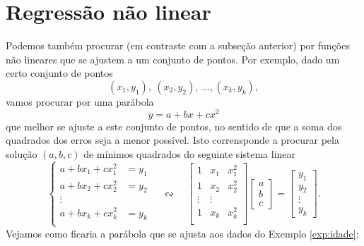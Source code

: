 \section{Regressão não linear}


Podemos também procurar (em contraste com a subseção anterior) por funções não lineares que se ajustem a um conjunto de pontos. Por exemplo, dado um certo conjunto de pontos
\begin{equation}
(x_1, y_1), \ (x_2, y_2), \ \dots, (x_k, y_k),
\end{equation} vamos procurar por uma parábola
\begin{equation}
y = a + bx + cx^2
\end{equation} que melhor se ajuste a este conjunto de pontos, no sentido de que a soma dos quadrados dos erros seja a menor possível. Isto corrensponde a procurar pela solução $(a,b, c)$ de mínimos quadrados do seguinte sistema linear
\begin{equation}
\left\{
  \begin{array}{rl}
    a + b x_1 + c x_1^2 &\!\!\!\!\!= y_1  \\
    a + b x_2 + c x_2^2 &\!\!\!\!\!= y_2  \\
    \vdots &  \\
    a + b x_k + c x_k^2 &\!\!\!\!\!= y_k  \\
  \end{array}
\right. \quad \leftrightsquigarrow  \quad
\begin{bmatrix}
  1 & x_1 & x_1^2 \\
  1 & x_2 & x_2^2 \\
  \vdots & \vdots \\
  1 & x_k & x_k^2 \\
\end{bmatrix}
\begin{bmatrix}
  a \\ b \\ c
\end{bmatrix} =
\begin{bmatrix}
  y_1 \\ y_2 \\ \vdots \\ y_k
\end{bmatrix}.
\end{equation} Vejamos como ficaria a parábola que se ajusta aos dados do Exemplo \ref{exp:idade}:

